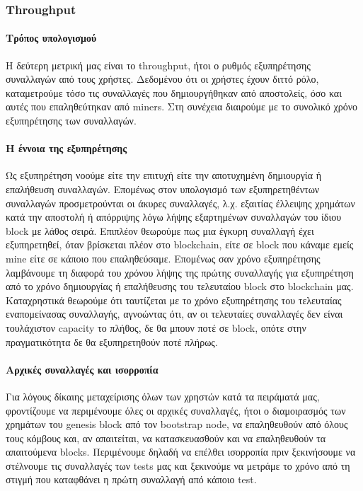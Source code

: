 \documentclass[titlepage]{article}
\begin{document}
\subsubsection{Throughput}

\paragraph{Τρόπος υπολογισμού}

Η δεύτερη μετρική μας είναι το throughput, ήτοι ο ρυθμός εξυπηρέτησης συναλλαγών από τους χρήστες. Δεδομένου ότι οι χρήστες έχουν διττό ρόλο, καταμετρούμε τόσο τις συναλλαγές που δημιουργήθηκαν από αποστολείς, όσο και αυτές που επαληθεύτηκαν από miners. Στη συνέχεια διαιρούμε με το συνολικό χρόνο εξυπηρέτησης των  συναλλαγών.

\paragraph{Η έννοια της εξυπηρέτησης}

Ως εξυπηρέτηση νοούμε είτε την επιτυχή είτε την αποτυχημένη δημιουργία ή επαλήθευση συναλλαγών. Επομένως στον υπολογισμό των εξυπηρετηθέντων συναλλαγών προσμετρούνται οι άκυρες συναλλαγές, λ.χ. εξαιτίας έλλειψης χρημάτων κατά την αποστολή ή απόρριψης λόγω λήψης εξαρτημένων συναλλαγών του ίδιου block με λάθος σειρά. Επιπλέον θεωρούμε πως μια έγκυρη συναλλαγή έχει εξυπηρετηθεί, όταν βρίσκεται πλέον στο blockchain, είτε σε block που κάναμε εμείς mine είτε σε κάποιο που επαληθεύσαμε. Επομένως σαν χρόνο εξυπηρέτησης λαμβάνουμε τη διαφορά του χρόνου λήψης της πρώτης συναλλαγής για εξυπηρέτηση από το χρόνο δημιουργίας ή επαλήθευσης του τελευταίου block στο blockchain μας. Καταχρηστικά θεωρούμε ότι ταυτίζεται με το χρόνο εξυπηρέτησης του τελευταίας εναπομείνασας συναλλαγής, αγνοώντας ότι, αν οι τελευταίες συναλλαγές δεν είναι τουλάχιστον capacity το πλήθος, δε θα μπουν ποτέ σε block, οπότε στην πραγματικότητα δε θα εξυπηρετηθούν ποτέ πλήρως.

\paragraph{Αρχικές συναλλαγές και ισορροπία}

Για λόγους δίκαιης μεταχείρισης όλων των χρηστών κατά τα πειράματά μας, φροντίζουμε να περιμένουμε όλες οι αρχικές συναλλαγές, ήτοι ο διαμοιρασμός των χρημάτων του genesis block από τον bootstrap node, να επαληθευθούν από όλους τους κόμβους και, αν απαιτείται, να κατασκευασθούν και να επαληθευθούν τα απαιτούμενα blocks. Περιμένουμε δηλαδή να επέλθει ισορροπία πριν ξεκινήσουμε να στέλνουμε τις συναλλαγές των tests μας και ξεκινούμε να μετράμε το χρόνο από τη στιγμή που καταφθάνει η πρώτη συναλλαγή από κάποιο test.
\end{document}

